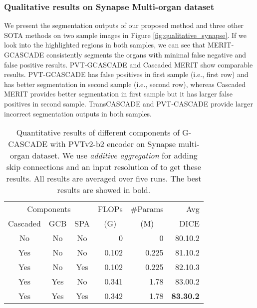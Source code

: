 \documentclass[10pt,twocolumn,letterpaper]{article}
\begin{document}
\subsubsection{Qualitative results on Synapse Multi-organ dataset}
\label{ssec:qualitative_synapse}
We present the segmentation outputs of our proposed method and three other SOTA methods on two sample images in Figure \ref{fig:qualitative_synapse}.
If we look into the highlighted regions in both samples, we can see that MERIT-GCASCADE consistently segments the organs with minimal false negative and false positive results. PVT-GCASCADE and Cascaded MERIT show comparable results. PVT-GCASCADE has false positives in first sample (i.e., first row) and has better segmentation in second sample (i.e., second row), whereas Cascaded MERIT provides better segmentation in first sample but it has larger false positives in second sample. TransCASCADE and PVT-CASCADE provide larger incorrect segmentation outputs in both samples. 


\begin{table}[]
\begin{center}
\begin{adjustbox}{width=0.48\textwidth}
\begin{tabular}{cccrrr}
\toprule
\multicolumn{3}{c}{Components} & \multicolumn{1}{c}{FLOPs} & \multicolumn{1}{c}{\#Params} & \multicolumn{1}{r}{Avg}  \\
Cascaded     & GCB     & SPA   & \multicolumn{1}{c}{(G)} & \multicolumn{1}{c}{(M)} & DICE                    \\
\midrule
No           & No     & No     &   0 & 0 & 80.10.2     \\
Yes          & No     & No     & 0.102 & 0.225 & 81.10.2    \\
Yes          & No    & Yes     & 0.102 & 0.225 & 82.10.3          \\
Yes          & Yes     & No    & 0.341 & 1.78 & 83.00.2      \\
Yes          & Yes    & Yes    & 0.342 & 1.78 & \textbf{83.30.2}       \\
\bottomrule 
\end{tabular}
\end{adjustbox}
\end{center}
\caption{Quantitative results of different components of G-CASCADE with PVTv2-b2 encoder on Synapse multi-organ dataset. We use \textit{additive aggregation} for adding skip connections and an input resolution of  to get these results. All results are averaged over five runs. The best results are showed in bold.}
\label{tab:ablation_components}
\end{table}
\end{document}
